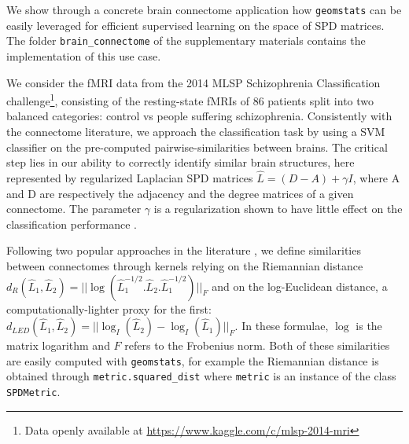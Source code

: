 \documentclass{article}
\begin{document}
We show through a concrete brain connectome application how  \texttt{geomstats} can be easily leveraged for efficient supervised learning on the space of SPD matrices. The folder \texttt{brain\_connectome} of the supplementary materials contains the implementation of this use case.

We consider the fMRI data from the 2014 MLSP Schizophrenia Classification challenge\footnote{Data openly available at \url{https://www.kaggle.com/c/mlsp-2014-mri}}, consisting of the resting-state fMRIs of 86 patients split into two balanced categories: control vs people suffering schizophrenia. Consistently with the connectome literature, we approach the classification task by using a SVM classifier on the pre-computed pairwise-similarities between brains. The critical step lies in our ability to correctly identify similar brain structures, here represented by regularized Laplacian SPD matrices $\hat{L}=(D-A)+\gamma I$, where A and D are respectively the adjacency and the degree matrices of a given connectome. The parameter $\gamma$ is a regularization shown to have little effect on the classification performance \cite{Dodero2015}. 

Following two popular approaches in the literature \cite{Dodero2015}, we define similarities between connectomes through kernels relying on the Riemannian distance $d_R(\hat{L}_1,\hat{L}_2)= ||\log(\hat{L}_1^{-1/2}.\hat{L}_2.\hat{L}_1^{-1/2})||_F$ and on the log-Euclidean distance, a computationally-lighter proxy for the first:
$d_{LED}(\hat{L}_1,\hat{L}_2)= ||\log_{I}(\hat{L}_2) -\log_{I}(\hat{L}_1)||_F$. In these formulae, $\log$ is the matrix logarithm and $F$ refers to the Frobenius norm. Both of these similarities are easily computed with \texttt{geomstats}, for example the Riemannian distance is obtained through \texttt{metric.squared\_dist} where \texttt{metric} is an instance of the class \texttt{SPDMetric}. 
\end{document}
